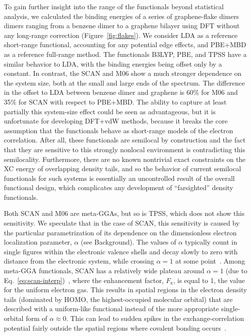To gain further insight into the range of the functionals beyond statistical analysis, we calculated the binding energies of a series of graphene-flake dimers dimers ranging from a benzene dimer to a graphene bilayer using DFT without any long-range correction (Figure~\ref{fig:flakes}).
We consider LDA as a reference short-range functional, accounting for any potential edge effects, and PBE+MBD as a reference full-range method.
The functionals B3LYP, PBE, and TPSS have a similar behavior to LDA, with the binding energies being offset only by a constant.
In contrast, the SCAN and M06 show a much stronger dependence on the system size, both at the small and large ends of the spectrum.
The difference in the offset to LDA between benzene dimer and graphene is 60\% for M06 and 35\% for SCAN with respect to PBE+MBD\@.
The ability to capture at least partially this system-size effect could be seen as advantageous, but it is unfortunate for developing DFT+vdW methods, because it breaks the core assumption that the functionals behave as short-range models of the electron correlation.
After all, these functionals are semilocal by construction and the fact that they are sensitive to this strongly nonlocal environment is contradicting this semilocality.
Furthermore, there are no known nontrivial exact constraints on the XC energy of overlapping density tails, and so the behavior of current semilocal functionals for such systems is essentially an uncontrolled result of the overall functional design, which complicates any development of ``farsighted'' density functionals.

Both SCAN and M06 are meta-GGAs, but so is TPSS, which does not show this sensitivity.
We speculate that in the case of SCAN, this sensitivity is caused by the particular parametrization of its dependence on the dimensionless electron localization parameter, $\alpha$ (see Background).
The values of $\alpha$ typically count in single figures within the electronic valence shells and decay slowly to zero with distance from the electronic system, while crossing $\alpha=1$ at some point~\cite{SunPRL13,BeckeJCP90}.
Among meta-GGA functionals, SCAN has a relatively wide plateau around $\alpha=1$ (due to Eq.~\ref{eq:scan-interp})~\cite{LoosJCP17}, where the enhancement factor, $F_\mathrm x$, is equal to 1, the value for the uniform electron gas.
This results in spatial regions in the electron density tails (dominated by HOMO, the highest-occupied molecular orbital) that are described with a uniform-like functional instead of the more appropriate single-orbital form of $\alpha\approx0$.
This can lead to sudden spikes in the exchange-correlation potential fairly outside the spatial regions where covalent bonding occurs~\cite{Gerit-private}.

